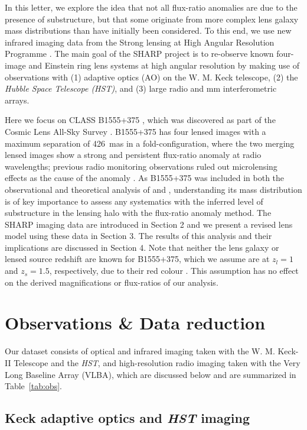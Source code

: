 \documentclass[a4paper,fleqn,usenatbib,useAMS]{mnras}
\begin{document}
In this letter, we explore the idea that not all flux-ratio anomalies are due to the presence of substructure, but that some originate from more complex lens galaxy mass distributions than have initially been considered. To this end, we use new infrared imaging data from the Strong lensing at High Angular Resolution Programme \citep[SHARP;][]{mckean07,lagattuta10,SHARP12, V12}. The main goal of the SHARP project is to re-observe known four-image and Einstein ring lens systems at high angular resolution by making use of observations with (1) adaptive optics (AO) on the W. M. Keck telescope, (2) the {\it Hubble Space Telescope (HST)}, and (3) large radio and mm interferometric arrays. 

Here we focus on CLASS B1555+375 \citep{Marlow99}, which was discovered as part of the Cosmic Lens All-Sky Survey \citep{CLASS1,CLASS2}. B1555+375 has four lensed images with a maximum separation of 426~mas in a fold-configuration, where the two merging lensed images show a strong and persistent flux-ratio anomaly at radio wavelengths; previous radio monitoring observations ruled out microlensing effects as the cause of the anomaly \citep{K03}. As B1555+375 was included in both the observational and theoretical analysis of \citet{Dalal2002} and \citet{Xu14}, understanding its mass distribution is of key importance to assess any systematics with the inferred level of substructure in the lensing halo with the flux-ratio anomaly method. The SHARP imaging data are introduced in Section 2 and we present a revised lens model using these data in Section 3. The results of this analysis and their implications are discussed in Section 4. Note that neither the lens galaxy or lensed source redshift are known for B1555+375, which we assume are at $z_l = 1$ and $z_s = 1.5$, respectively, due to their red colour \citep{Marlow99}. This assumption has no effect on the derived magnifications or flux-ratios of our analysis.


\section{Observations \& Data reduction}

Our dataset consists of optical and infrared imaging taken with the W. M. Keck-II Telescope and the {\it HST}, and high-resolution radio imaging taken with the Very Long Baseline Array (VLBA), which are discussed below and are summarized in Table~\ref{tab:obs}.

\subsection{Keck adaptive optics and {\it HST} imaging}
\end{document}
